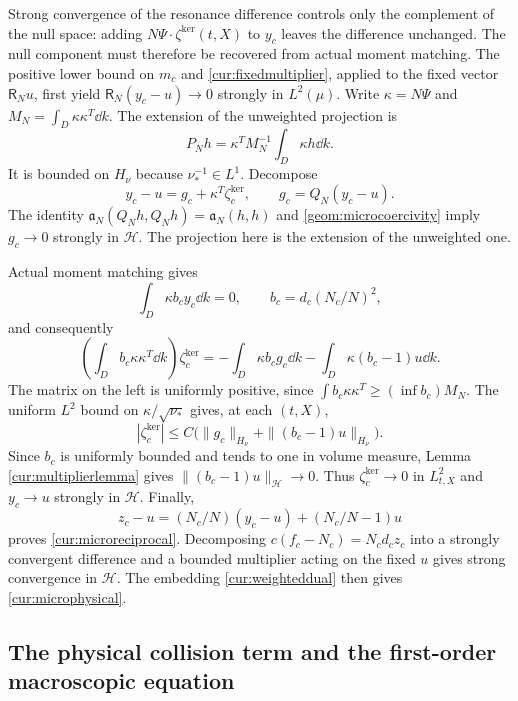 Strong convergence of the resonance difference controls only the
complement of the null space: adding
$N\Psi\cdot\zeta^{\mathrm{ker}}(t,X)$ to $y_c$ leaves the difference
unchanged. The null component must therefore be recovered from actual
moment matching. The positive lower bound on $m_c$ and
\eqref{cur:fixedmultiplier}, applied to the fixed vector $\mathsf R_Nu$,
first yield $\mathsf R_N(y_c-u)\to0$ strongly in $L^2(\mu)$.
Write $\kappa=N\Psi$ and $M_N=\int_D\kappa\kappa^T\dd k$.
The extension of the unweighted projection is
\[
 P_Nh=\kappa^TM_N^{-1}\int_D\kappa h\dd k.
\]
It is bounded on $H_\nu$ because $\nu_*^{-1}\in L^1$.
Decompose
\[
 y_c-u=g_c+\kappa^T\zeta_c^{\mathrm{ker}},\qquad g_c=Q_N(y_c-u).
\]
The identity $\mathfrak a_N(Q_Nh,Q_Nh)=\mathfrak a_N(h,h)$ and
\eqref{geom:microcoercivity} imply $g_c\to0$ strongly in $\mathcal H$.
The projection here is the extension of the unweighted one.

Actual moment matching gives
\begin{equation}\label{cur:unknowngram}
 \int_D\kappa b_cy_c\dd k=0,\qquad
 b_c=d_c(N_c/N)^2,
\end{equation}
and consequently
\begin{equation}\label{cur:gramrecovery}
 \left(\int_Db_c\kappa\kappa^T\dd k\right)\zeta_c^{\mathrm{ker}}
      =-\int_D\kappa b_cg_c\dd k
       -\int_D\kappa(b_c-1)u\dd k.
\end{equation}
The matrix on the left is uniformly positive, since
$\int b_c\kappa\kappa^T\ge(\inf b_c)M_N$.
The uniform $L^2$ bound on $\kappa/\sqrt{\nu_*}$ gives, at each $(t,X)$,
\begin{equation}\label{cur:gramestimate}
 |\zeta_c^{\mathrm{ker}}|\le C\bigl(\|g_c\|_{H_\nu}
                         +\|(b_c-1)u\|_{H_\nu}\bigr).
\end{equation}
Since $b_c$ is uniformly bounded and tends to one in volume measure,
Lemma \ref{cur:multiplierlemma} gives
$\|(b_c-1)u\|_{\mathcal H}\to0$.
Thus $\zeta_c^{\mathrm{ker}}\to0$ in $L^2_{t,X}$ and
$y_c\to u$ strongly in $\mathcal H$. Finally,
\[
 z_c-u=(N_c/N)(y_c-u)+(N_c/N-1)u
\]
proves \eqref{cur:microreciprocal}. Decomposing
$c(f_c-N_c)=N_cd_cz_c$ into a strongly convergent difference and a
bounded multiplier acting on the fixed $u$ gives strong convergence
in $\mathcal H$. The embedding \eqref{cur:weighteddual} then gives
\eqref{cur:microphysical}.

\subsection{The physical collision term and the first-order macroscopic equation}

